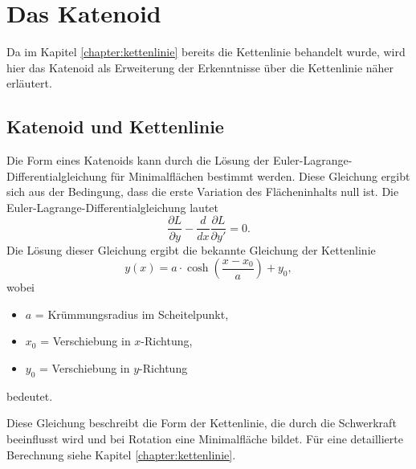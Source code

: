 %
%
%
%
\section{Das Katenoid
	\label{minimalflaechen:section:Das Katenoid}}
Da im Kapitel \ref{chapter:kettenlinie} bereits die Kettenlinie behandelt wurde, wird hier das Katenoid als Erweiterung der Erkenntnisse über die Kettenlinie näher erläutert. 

\subsection{Katenoid und Kettenlinie
	\label{Das Katenoid:subsection:Katenoid und Kettenlinie}}
Die Form eines Katenoids kann durch die Lösung der Euler-Lagrange-Differentialgleichung für Minimalflächen bestimmt werden.
Diese Gleichung ergibt sich aus der Bedingung, dass die erste Variation des Flächeninhalts null ist.
Die Euler-Lagrange-Differentialgleichung lautet
\begin{equation}
	\frac{\partial L}{\partial y} - \frac{d}{dx} \frac{\partial L}{\partial y'} = 0.
\end{equation}
%
Die Lösung dieser Gleichung ergibt die bekannte Gleichung der Kettenlinie
\begin{equation}
	y(x) = a \cdot \cosh \left( \frac{x - x_0}{a} \right) + y_0,
\end{equation}
%
wobei
\begin{itemize}
	\item \(a\) = Krümmungsradius im Scheitelpunkt,
	\item \(x_0\) = Verschiebung in $x$-Richtung,
	\item \(y_0\) = Verschiebung in $y$-Richtung
\end{itemize}
bedeutet.

Diese Gleichung beschreibt die Form der Kettenlinie, die durch die Schwerkraft beeinflusst wird und bei Rotation eine Minimalfläche bildet.
Für eine detaillierte Berechnung siehe Kapitel \ref{chapter:kettenlinie}.
